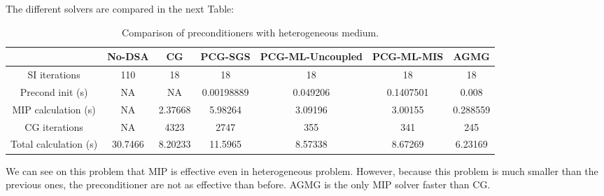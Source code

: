 The different solvers are compared in the next Table:
\begin{table}[H]
\begin{center}
\begin{tabular}{|c|c|c|c|c|c|c|}
\hline
 & No-DSA & CG & PCG-SGS & PCG-ML-Uncoupled & PCG-ML-MIS & AGMG\\
\hline
SI iterations & 110 & 18 & 18 & 18 & 18 & 18\\
Precond init (s) & NA & NA &  0.00198889 & 0.049206 & 0.1407501 & 0.008\\
MIP calculation (s) & NA & 2.37668 & 5.98264 & 3.09196 & 3.00155 & 0.288559\\
CG iterations & NA & 4323 & 2747 & 355 & 341 & 245\\
Total calculation (s) & 30.7466 & 8.20233 & 11.5965 & 8.57338 & 8.67269 &
6.23169\\
\hline
\end{tabular}
\caption{Comparison of preconditioners with heterogeneous medium.}
\end{center}
\end{table}
We can see on this problem that MIP is effective even in heterogeneous
problem. However, because this problem is much smaller than the previous ones,
the preconditioner are not as effective than before. AGMG is the only MIP solver
faster than CG.
